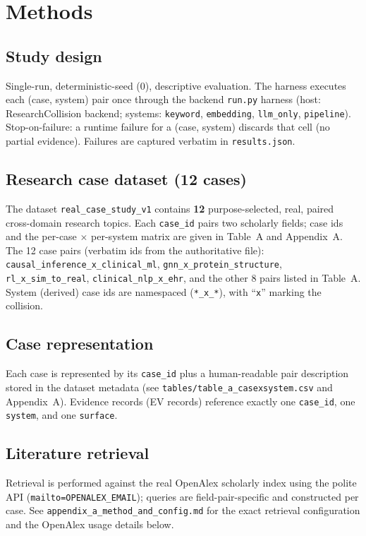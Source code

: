 \documentclass[11pt]{article}
\begin{document}
\section{Methods}
\label{sec:method}

\subsection{Study design}
\label{sec:design}
Single-run, deterministic-seed ($0$), descriptive evaluation. The harness
executes each (case, system) pair once through the backend \texttt{run.py}
harness (host: ResearchCollision backend; systems: \texttt{keyword},
\texttt{embedding}, \texttt{llm\_only}, \texttt{pipeline}). Stop-on-failure: a
runtime failure for a (case, system) discards that cell (no partial evidence).
Failures are captured verbatim in \texttt{results.json}.

\subsection{Research case dataset (12 cases)}
\label{sec:corpus}
The dataset \texttt{real\_case\_study\_v1} contains \textbf{12} purpose-selected,
real, paired cross-domain research topics. Each \texttt{case\_id} pairs two
scholarly fields; case ids and the per-case $\times$ per-system matrix are given
in Table~A and Appendix~A. The 12 case pairs (verbatim ids from the authoritative
file): \texttt{causal\_inference\_x\_clinical\_ml}, \texttt{gnn\_x\_protein\_structure},
\texttt{rl\_x\_sim\_to\_real}, \texttt{clinical\_nlp\_x\_ehr}, and the other 8
pairs listed in Table~A. System (derived) case ids are namespaced
(\texttt{*\_x\_*}), with ``\texttt{x}'' marking the collision.

\subsection{Case representation}
\label{sec:caserep}
Each case is represented by its \texttt{case\_id} plus a human-readable pair
description stored in the dataset metadata (see \texttt{tables/table\_a\_casexsystem.csv}
and Appendix~A). Evidence records (EV records) reference exactly one
\texttt{case\_id}, one \texttt{system}, and one \texttt{surface}.

\subsection{Literature retrieval}
\label{sec:retrieval}
Retrieval is performed against the real OpenAlex scholarly index using the
polite API (\texttt{mailto=OPENALEX\_EMAIL}); queries are field-pair-specific
and constructed per case. See \texttt{appendix\_a\_method\_and\_config.md} for
the exact retrieval configuration and the OpenAlex usage details below.
\end{document}
